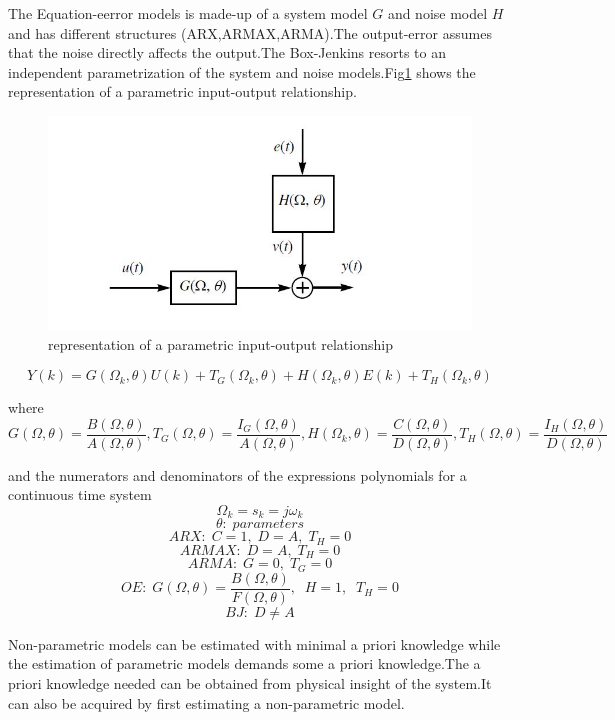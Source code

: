 \documentclass[a4paper,12pt]{report}
\numberwithin{equation}{section}
\begin{document}
The Equation-eerror models is made-up of a system model $G$ and noise model $H$ and has different structures (ARX,ARMAX,ARMA).The output-error assumes that the noise directly affects the output.The Box-Jenkins resorts to an independent parametrization of the system and noise models.Fig\ref{fig:par_res} shows the representation of a parametric input-output relationship.

\begin{figure}[H]
    \includegraphics[scale=1]{parametric_repre.JPG}
    \centering
    \caption{representation of a parametric input-output relationship}
    \label{fig:par_res}
\end{figure}

\begin{equation}\label{eq:trfctmodels}
Y(k)=G\left(\Omega_{k}, \theta\right) U(k)+T_{G}\left(\Omega_{k}, \theta\right)+H\left(\Omega_{k}, \theta\right) E(k)+T_{H}\left(\Omega_{k}, \theta\right)    
\end{equation}


\noindent
where
\[G(\Omega, \theta)=\frac{B(\Omega, \theta)}{A(\Omega, \theta)}, T_{G}(\Omega, \theta)=\frac{I_{G}(\Omega, \theta)}{A(\Omega, \theta)}, H\left(\Omega_{k}, \theta\right)=\frac{C(\Omega, \theta)}{D(\Omega, \theta)}, T_{H}(\Omega, \theta)=\frac{I_{H}(\Omega, \theta)}{D(\Omega, \theta)}\]

\noindent
and the numerators and denominators of the expressions polynomials for a continuous time system
\[\Omega_{k}= s_k =j\omega_{k}\]
\[\theta:\;parameters\]
\[ARX:\; C=1,\; D=A,\; T_{H}=0\]
\[ARMAX:\; D=A,\; T_{H}=0 \]
\[ARMA:\; G=0,\; T_{G}=0\]
\[OE:\; G(\Omega, \theta)=\frac{B(\Omega, \theta)}{F(\Omega, \theta)},\;\;H=1 ,\;\; T_{H}=0  \]
\[BJ:\; D \neq A\]


Non-parametric models can be estimated with minimal a priori knowledge while the estimation of parametric models demands some a priori knowledge.The a priori knowledge needed can be obtained from physical insight of the system.It can also be acquired by first estimating a non-parametric model.
\end{document}
